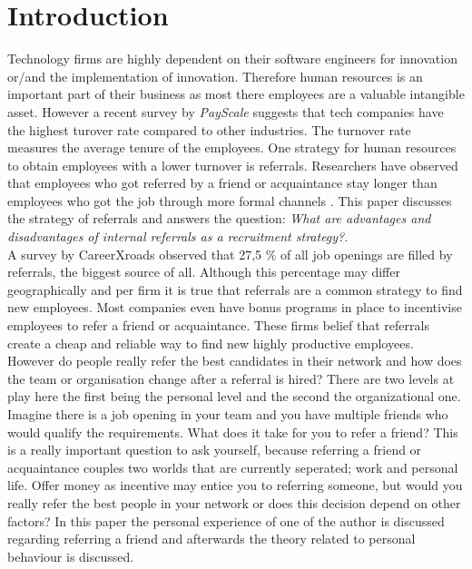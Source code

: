 \documentclass[a4paper, 11pt]{article} %
\begin{document}
\section*{Introduction}


Technology firms are highly dependent on their software engineers for innovation or/and the implementation of innovation. Therefore human resources is an important part of their business as most there employees are a valuable intangible asset. However a recent survey by \textit{PayScale} \cite{turnover} suggests that tech companies have the highest turover rate compared to other industries. The turnover rate measures the average tenure of the employees. One strategy for human resources to obtain employees with a lower turnover is referrals. Researchers have observed that employees who got referred by a friend or acquaintance stay longer than employees who got the job through more formal channels \cite{sixth,ten}. This paper discusses the strategy of referrals and answers the question: \emph{What are advantages and disadvantages of internal referrals as a recruitment strategy?}. \\

A survey by CareerXroads \cite{referralpercentage} observed that 27,5 \% of all job openings are filled by referrals, the biggest source of all. Although this percentage may differ geographically and per firm it is true that referrals are a common strategy to find new employees. Most companies even have bonus programs in place to  incentivise employees to refer a friend or acquaintance. These firms belief that referrals create a cheap \cite{fourth} and reliable way to find new highly productive employees. However do people really refer the best candidates in their network and how does the team or organisation change after a referral is hired? There are two levels at play here the first being the personal level and the second the organizational one. \\

Imagine there is a job opening in your team and you have multiple friends who would qualify the requirements. What does it take for you to refer a friend? This is a really important question to ask yourself, because referring a friend or acquaintance couples two worlds that are currently seperated; work and personal life. Offer money as incentive may entice you to referring someone, but would you really refer the best people in your network or does this decision depend on other factors? In this paper the personal experience of one of the author is discussed regarding referring a friend and afterwards the theory related to personal behaviour is discussed.
\end{document}

